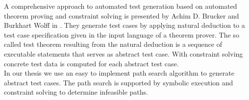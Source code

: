 A comprehensive approach to automated test generation based on automated theorem proving and constraint solving is presented by Achim D. Brucker and Burkhart Wolff in \cite{brucker2012theoremProverBasedTesting}. They generate test cases by applying natural deduction to a %
test case specification given in the input language of a theorem prover. The so called test theorem resulting from the natural deduction is a sequence of executable statements that serves as abstract test case. With constraint solving concrete test data is computed for each abstract test case.\\
In our thesis we use an easy to implement path search algorithm to generate abstract test cases. The path search is supported by symbolic execution and constraint solving to determine infeasible paths.
% 
